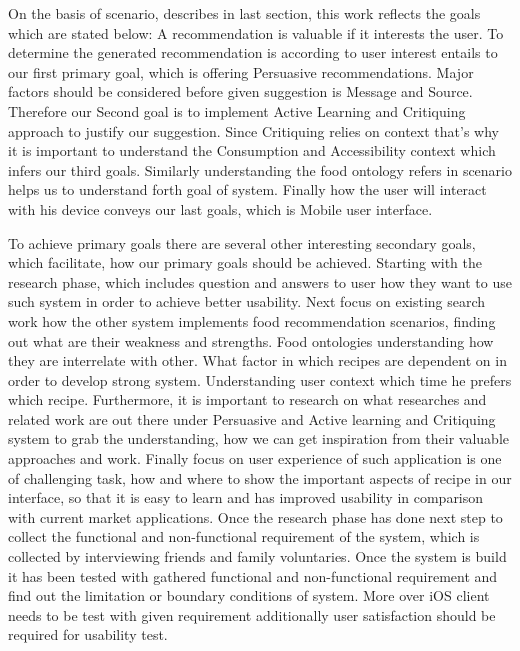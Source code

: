 On the basis of scenario, describes in last section, this work reflects the goals which are stated below:\newline
A recommendation is valuable if it interests the user. To determine the generated recommendation is according to user interest entails to our first primary goal, which is offering Persuasive recommendations. Major factors should be considered before given suggestion is Message and Source. Therefore our Second goal is to implement Active Learning and Critiquing approach to justify our suggestion. Since Critiquing relies on context that’s why it is important to understand the Consumption and Accessibility context which infers our third goals.  Similarly understanding the food ontology refers in scenario helps us to understand forth goal of system. Finally how the user will interact with his device conveys our last goals, which is Mobile user interface.\newline

To achieve primary goals there are several other interesting secondary goals, which facilitate, how our primary goals should be achieved. Starting with the research phase, which includes question and answers to user how they want to use such system in order to achieve better usability. Next focus on existing search work how the other system implements food recommendation scenarios, finding out what are their weakness and strengths. Food ontologies understanding how they are interrelate with other. What factor in which recipes are dependent on in order to develop strong system. Understanding user context which time he prefers which recipe. Furthermore, it is important to research on what researches and related work are out there under Persuasive and Active learning and Critiquing system to grab the understanding, how we can get inspiration from their valuable approaches and work. Finally focus on user experience of such application is one of challenging task, how and where to show the important aspects of recipe in our interface, so that it is easy to learn and has improved usability in comparison with current market applications.\newline
Once the research phase has done next step to collect the functional and non-functional requirement of the system, which is collected by interviewing friends and family voluntaries. Once the system is build it has been tested with gathered functional and non-functional requirement and find out the limitation or boundary conditions of system. More over iOS client needs to be test with given requirement additionally user satisfaction should be required for usability test.\newline

